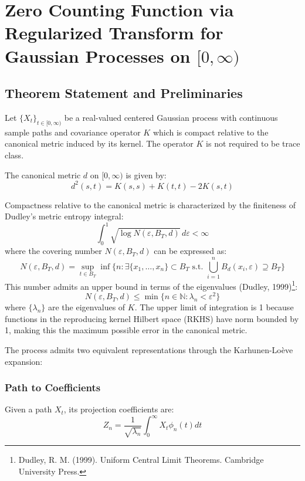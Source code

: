\documentclass{article}
\begin{document}
\section{Zero Counting Function via Regularized Transform for Gaussian Processes on $[0,\infty)$}

\subsection{Theorem Statement and Preliminaries}
Let $\{X_t\}_{t\in[0,\infty)}$ be a real-valued centered Gaussian process with continuous sample paths and covariance operator $K$ which is compact relative to the canonical metric induced by its kernel. The operator $K$ is not required to be trace class. 

The canonical metric $d$ on $[0,\infty)$ is given by:
\begin{equation}
    d^2(s,t) = K(s,s) + K(t,t) - 2K(s,t)
\end{equation}

Compactness relative to the canonical metric is characterized by the finiteness of Dudley's metric entropy integral:
\begin{equation}
    \int_0^1 \sqrt{\log N(\varepsilon,B_T,d)} \, d\varepsilon < \infty
\end{equation}
where the covering number $N(\varepsilon,B_T,d)$ can be expressed as:
\begin{equation}
    N(\varepsilon,B_T,d) = \sup_{t \in B_T} \inf\{n : \exists \{x_1,\ldots,x_n\} \subset B_T \text{ s.t. } \bigcup_{i=1}^n B_d(x_i,\varepsilon) \supseteq B_T\}
\end{equation}
This number admits an upper bound in terms of the eigenvalues (Dudley, 1999)\footnote{Dudley, R. M. (1999). Uniform Central Limit Theorems. Cambridge University Press.}:
\begin{equation}
    N(\varepsilon,B_T,d) \leq \min\{n \in \mathbb{N} : \lambda_n < \varepsilon^2\}
\end{equation}
where $\{\lambda_n\}$ are the eigenvalues of $K$. The upper limit of integration is 1 because functions in the reproducing kernel Hilbert space (RKHS) have norm bounded by 1, making this the maximum possible error in the canonical metric.

The process admits two equivalent representations through the Karhunen-Loève expansion:

\subsubsection*{Path to Coefficients}
Given a path $X_t$, its projection coefficients are:
\begin{equation}
    Z_n = \frac{1}{\sqrt{\lambda_n}} \int_0^\infty X_t \phi_n(t) dt
\end{equation}
\end{document}
